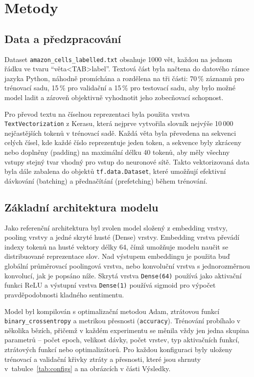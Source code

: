 \documentclass[a4paper,oneside,11pt,usenames,dvipsnames]{article}
\begin{document}
\section{Metody}
\label{sec:metody}

\subsection{Data a předzpracování}
\label{subsec:data-a-predzpracovani}
Dataset \texttt{amazon\_cells\_labelled.txt} obsahuje 1000 vět, každou na jednom řádku ve tvaru ``věta<TAB>label''. Textová část byla načtena do datového rámce jazyka Python, náhodně promíchána a rozdělena na tři části: 70\,\% záznamů pro trénovací sadu, 15\,\% pro validační a 15\,\% pro testovací sadu, aby bylo možné model ladit a zároveň objektivně vyhodnotit jeho zobecňovací schopnost.

Pro převod textu na číselnou reprezentaci byla použita vrstva \texttt{TextVectorization} z Kerasu, která nejprve vytvořila slovník nejvýše 10\,000 nejčastějších tokenů v trénovací sadě. Každá věta byla převedena na sekvenci celých čísel, kde každé číslo reprezentuje jeden token, a sekvence byly zkráceny nebo doplněny (padding) na maximální délku 40 tokenů, aby měly všechny vstupy stejný tvar vhodný pro vstup do neuronové sítě. Takto vektorizovaná data byla dále zabalena do objektů \texttt{tf.data.Dataset}, které umožňují efektivní dávkování (batching) a přednačítání (prefetching) během trénování.

\subsection{Základní architektura modelu}
\label{subsec:zakladni-architektura-modelu}
Jako referenční architektura byl zvolen model složený z embedding vrstvy, pooling vrstvy a jedné skryté husté (Dense) vrstvy. Embedding vrstva převádí indexy tokenů na husté vektory délky 64, čímž umožňuje modelu naučit se distribuované reprezentace slov. Nad výstupem embeddingu je použita buď globální průměrovací poolingová vrstva, nebo konvoluční vrstva s jednorozměrnou konvolucí, jak je popsáno níže. Skrytá vrstva \texttt{Dense(64)} používá jako aktivační funkci ReLU a výstupní vrstva \texttt{Dense(1)} používá sigmoid pro výpočet pravděpodobnosti kladného sentimentu.

Model byl kompilován s optimalizační metodou Adam, ztrátovou funkcí \texttt{binary\_crossentropy} a metrikou přesnosti (\texttt{accuracy}). Trénování probíhalo v několika bězích, přičemž v každém experimentu se měnila vždy jen jedna skupina parametrů -- počet epoch, velikost dávky, počet vrstev, typ aktivačních funkcí, ztrátových funkcí nebo optimalizátorů. Pro každou konfiguraci byly uloženy trénovací a validační křivky ztráty a přesnosti, které jsou shrnuty v~tabulce~\ref{tab:configs} a na obrázcích v části Výsledky.
\end{document}

